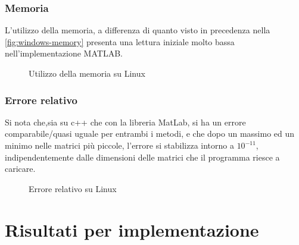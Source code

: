\documentclass[11pt,italian]{article}
\begin{document}
\subsubsection*{Memoria}
L'utilizzo della memoria, a differenza di quanto visto in precedenza nella \cref{fig:windows-memory} presenta una lettura iniziale molto bassa nell'implementazione MATLAB.
\begin{figure}[H]
    \caption{Utilizzo della memoria su Linux}
    \label{fig:linux-memory}
\end{figure}

\smallskip
\subsubsection*{Errore relativo}
Si nota che,sia su c++ che con la libreria MatLab, si ha un errore comparabile/quasi uguale per entrambi i metodi, e che dopo un massimo ed un minimo nelle matrici più piccole, l'errore si stabilizza intorno a $10^{-11}$, indipendentemente dalle dimensioni delle matrici che il programma riesce a caricare.
\begin{figure}[H]
    \caption{Errore relativo su Linux}
    \label{fig:linux-error}
\end{figure}

\newpage
\section{Risultati per implementazione}
\label{section-results-os}
\end{document}
